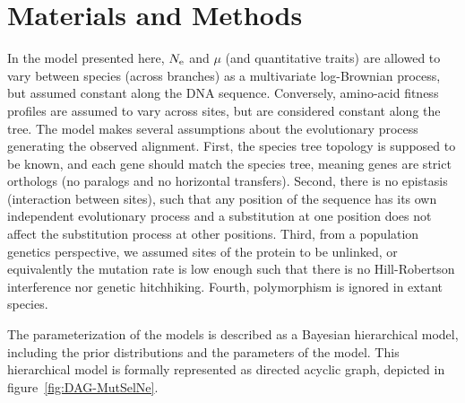 \documentclass{article}
\begin{document}
\section{Materials and Methods}
\label{sec:MatMet}

In the model presented here, $N_{\text{e}}$ and $\mu$ (and quantitative traits) are allowed to vary between species (across branches) as a multivariate log-Brownian process, but assumed constant along the DNA sequence.
Conversely, amino-acid fitness profiles are assumed to vary across sites, but are considered constant along the tree.
The model makes several assumptions about the evolutionary process generating the observed alignment.
First, the species tree topology is supposed to be known, and each gene should match the species tree, meaning genes are strict orthologs (no paralogs and no horizontal transfers).
Second, there is no epistasis (interaction between sites), such that any position of the sequence has its own independent evolutionary process and a substitution at one position does not affect the substitution process at other positions.
Third, from a population genetics perspective, we assumed sites of the protein to be unlinked, or equivalently the mutation rate is low enough such that there is no Hill-Robertson interference nor genetic hitchhiking.
Fourth, polymorphism is ignored in extant species.

The parameterization of the models is described as a Bayesian hierarchical model, including the prior distributions and the parameters of the model.
This hierarchical model is formally represented as directed acyclic graph, depicted in figure~\ref{fig:DAG-MutSelNe}.
\end{document}
